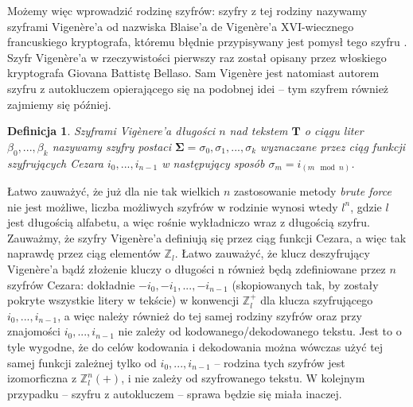 \documentclass[a4paper]{article}
\theoremstyle{defn}
\newtheorem{defn}{Definicja}[subsection]
\theoremstyle{theorem}
\theoremstyle{lemma}
\theoremstyle{cor}
\theoremstyle{fact}
\begin{document}
Możemy więc wprowadzić rodzinę szyfrów: szyfry z tej rodziny nazywamy szyframi Vigenère'a od nazwiska Blaise'a de Vigenère'a XVI-wiecznego francuskiego kryptografa, któremu błędnie przypisywany jest pomysł tego szyfru \cite{vigenere}. Szyfr Vigenère'a w rzeczywistości pierwszy raz został opisany przez włoskiego kryptografa Giovana Battistę Bellaso. Sam Vigenère jest natomiast autorem szyfru z autokluczem \cite{autokey} opierającego się na podobnej idei – tym szyfrem również zajmiemy się później.\\
\begin{defn}\label{defn4.2.1}
\textit{Szyframi Vigènere'a} długości $n$ nad tekstem $\boldsymbol{T}$ o ciągu liter $\beta_0, ..., \beta_k$ nazywamy szyfry postaci $\boldsymbol{\Sigma} = \sigma_0, \sigma_1, ..., \sigma_k$ wyznaczane przez ciąg funkcji szyfrujących Cezara $i_0, ..., i_{n-1}$ w następujący sposób $\sigma_m = i_{(m \mod n)}$.
\end{defn}
Łatwo zauważyć, że już dla nie tak wielkich $n$ zastosowanie metody \textit{brute force} nie jest możliwe, liczba możliwych szyfrów w rodzinie wynosi wtedy $l^n$, gdzie $l$ jest długością alfabetu, a więc rośnie wykładniczo wraz z długością szyfru. Zauważmy, że szyfry Vigenère'a definiują się przez ciąg funkcji Cezara, a więc tak naprawdę przez ciąg elementów $\mathbb{Z}_l$. Łatwo zauważyć, że klucz deszyfrujący Vigenère'a bądź złożenie kluczy o długości n również będą zdefiniowane przez $n$ szyfrów Cezara: dokładnie $-i_0, -i_1, ..., -i_{n-1}$ (skopiowanych tak, by zostały pokryte wszystkie litery w tekście) w konwencji $\mathbb{Z}_l^+$ dla klucza szyfrującego $i_0, ..., i_{n-1}$, a więc należy również do tej samej rodziny szyfrów oraz przy znajomości $i_0, ..., i_{n-1}$ nie zależy od kodowanego/dekodowanego tekstu. Jest to o tyle wygodne, że do celów kodowania i dekodowania można wówczas użyć tej samej funkcji zależnej tylko od $i_0, ..., i_{n-1}$ – rodzina tych szyfrów jest izomorficzna z $\mathbb{Z}_l^n(+)$, i nie zależy od szyfrowanego tekstu. W kolejnym przypadku – szyfru z autokluczem – sprawa będzie się miała inaczej.\\
\end{document}
